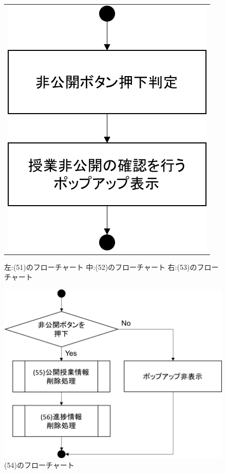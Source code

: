 \begin{figure}[htbp]
\begin{tabular}{c}
\begin{minipage}{0.33\hsize}
\begin{center}
  \end{center}
 \end{minipage}
 \begin{minipage}{0.33\hsize}
  \begin{center}
   \includegraphics[width=0.8\linewidth,clip]{./img/flow/53.png}
  \end{center}
 \end{minipage}
\end{tabular}
 \caption{左:(51)のフローチャート 中:(52)のフローチャート 右:(53)のフローチャート}\label{fig:51to52to53}
\end{figure}

\begin{figure}[htbp]
  \begin{center}
   \includegraphics[width=0.5\linewidth,clip]{./img/flow/54.png}
  \end{center}
 \caption{(54)のフローチャート}\label{fig:54}
\end{figure}

